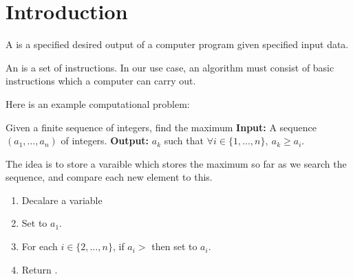 \documentclass[11pt]{report}
\begin{document}
\section{Introduction}
\begin{defi}
    A  is a specified desired output of a computer program given specified input data.
\end{defi}
\begin{defi}[Algorithm]
    An  is a set of instructions. In our use case, an algorithm must consist of basic instructions which a computer can carry out.
\end{defi}
Here is an example computational problem:
\begin{nproblem} Given a finite sequence of integers, find the maximum
    \mypar
    \textbf{Input: }A sequence $(a_1,\dots,a_n)$ of integers.
    \mypar \textbf{Output: }$a_k$ such that $\forall i \in \{1,\dots,n\}, \ a_k \geq a_i$.
\end{nproblem}
\begin{algEng} The idea is to store a varaible which stores the maximum so far as we search the sequence, and compare each new element to this.
    \begin{enumerate}
        \item Decalare a variable 
        \item Set  to $a_1$.
        \item For each $i \in \{2,\dots,n\}$, if $a_i > $  then set  to $a_i$.
        \item Return .
    \end{enumerate}
\end{algEng}
\end{document}
